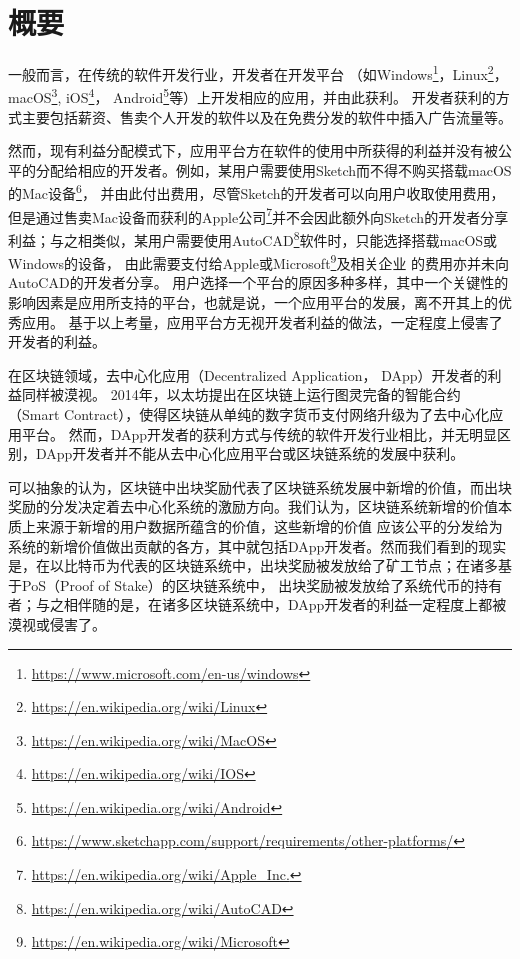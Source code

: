 \section{概要}

一般而言，在传统的软件开发行业，开发者在开发平台
（如Windows\footnote{\url{https://www.microsoft.com/en-us/windows}}，Linux\footnote{\url{https://en.wikipedia.org/wiki/Linux}}，
macOS\footnote{\url{https://en.wikipedia.org/wiki/MacOS}},
iOS\footnote{\url{https://en.wikipedia.org/wiki/IOS}}，
Android\footnote{\url{https://en.wikipedia.org/wiki/Android}}等）上开发相应的应用，并由此获利。
开发者获利的方式主要包括薪资、售卖个人开发的软件以及在免费分发的软件中插入广告流量等。

然而，现有利益分配模式下，应用平台方在软件的使用中所获得的利益并没有被公平的分配给相应的开发者。例如，某用户需要使用Sketch而不得不购买搭载macOS的Mac设备\footnote{\url{https://www.sketchapp.com/support/requirements/other-platforms/}}，
并由此付出费用，尽管Sketch的开发者可以向用户收取使用费用，
但是通过售卖Mac设备而获利的Apple公司\footnote{\url{https://en.wikipedia.org/wiki/Apple_Inc.}}并不会因此额外向Sketch的开发者分享利益；与之相类似，某用户需要使用AutoCAD\footnote{\url{https://en.wikipedia.org/wiki/AutoCAD}}软件时，只能选择搭载macOS或Windows的设备，
由此需要支付给Apple或Microsoft\footnote{\url{https://en.wikipedia.org/wiki/Microsoft}}及相关企业
的费用亦并未向AutoCAD的开发者分享。
用户选择一个平台的原因多种多样，其中一个关键性的影响因素是应用所支持的平台，也就是说，一个应用平台的发展，离不开其上的优秀应用。
基于以上考量，应用平台方无视开发者利益的做法，一定程度上侵害了开发者的利益。

在区块链领域，去中心化应用（Decentralized Application， DApp）开发者的利益同样被漠视。
2014年，以太坊提出在区块链上运行图灵完备的智能合约（Smart Contract），使得区块链从单纯的数字货币支付网络升级为了去中心化应用平台。
然而，DApp开发者的获利方式与传统的软件开发行业相比，并无明显区别，DApp开发者并不能从去中心化应用平台或区块链系统的发展中获利。

可以抽象的认为，区块链中出块奖励代表了区块链系统发展中新增的价值，而出块奖励的分发决定着去中心化系统的激励方向。我们认为，区块链系统新增的价值本质上来源于新增的用户数据所蕴含的价值，这些新增的价值
应该公平的分发给为系统的新增价值做出贡献的各方，其中就包括DApp开发者。然而我们看到的现实是，在以比特币为代表的区块链系统中，出块奖励被发放给了矿工节点；在诸多基于PoS（Proof of Stake）的区块链系统中，
出块奖励被发放给了系统代币的持有者；与之相伴随的是，在诸多区块链系统中，DApp开发者的利益一定程度上都被漠视或侵害了。

